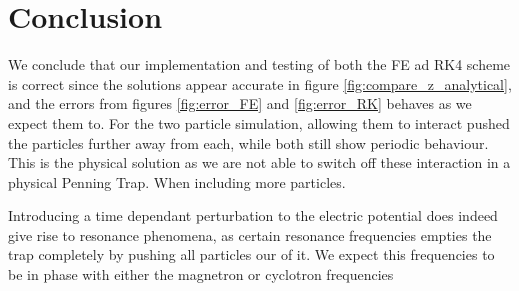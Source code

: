 \section{Conclusion}\label{sec:conclusion}

We conclude that our implementation and testing of both the FE ad RK4 scheme is correct since the solutions appear accurate in figure \ref{fig:compare_z_analytical}, and the errors from figures \ref{fig:error_FE} and \ref{fig:error_RK} behaves as we expect them to. For the two particle simulation, allowing them to interact pushed the particles further away from each, while both still show periodic behaviour. This is the physical solution as we are not able to switch off these interaction in a physical Penning Trap. When including more particles. 

Introducing a time dependant perturbation to the electric potential does indeed give rise to resonance phenomena, as certain resonance frequencies empties the trap completely by pushing all particles our of it. We expect this frequencies to be in phase with either the magnetron or cyclotron frequencies 
